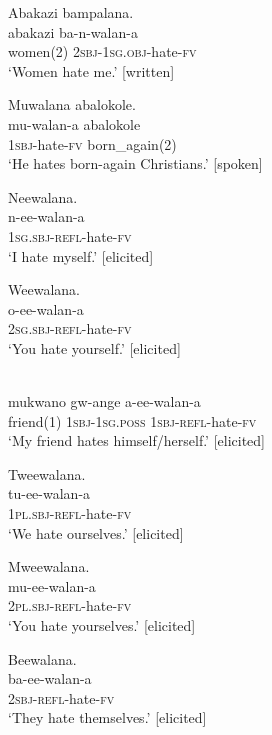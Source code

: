 \documentclass[output=paper,colorlinks,citecolor=brown,
]{langscibook}
\begin{document}
\ea\label{ex:Witzlack:1}

\ea \label{ex:Witzlack:1a}
\glll Abakazi bampalana.\\
        abakazi		ba-n-walan-a\\
     women(2) \textsc{2sbj}-\textsc{1sg.obj}-hate-\textsc{fv}\\
\glt `Women hate me.' [written]

\ex \label{ex:Witzlack:1b}
\glll Muwalana abalokole.\\
    mu-walan-a	abalokole\\
\textsc{1sbj}-hate-\textsc{fv}	born\_again(2)\\
\glt ‘He hates born-again Christians.’ [spoken] %
\z 
\z 

\ea\label{ex:Witzlack:2}

\ea  \label{ex:Witzlack:2a}
\glll Neewalana.\\
    n-ee-walan-a\\
     \textsc{1sg.sbj}-\textsc{refl}-hate-\textsc{fv}\\
\glt ‘I hate myself.’ [elicited]

\ex \label{ex:Witzlack:2b}
\glll Weewalana.\\
    o-ee-walan-a\\
\textsc{2sg.sbj}-\textsc{refl}-hate-\textsc{fv}\\
\glt ‘You hate yourself.’ [elicited]

\ex \label{ex:Witzlack:2c}
\\
 mukwano		gw-ange		a-ee-walan-a\\
friend(1)		\textsc{1sbj-1sg.poss} 	\textsc{1sbj}-\textsc{refl}-hate-\textsc{fv}\\
\glt ‘My friend hates himself/herself.’ [elicited]

\ex  \label{ex:Witzlack:2d}
\glll Tweewalana.\\
    tu-ee-walan-a\\
\textsc{1pl.}\textsc{sbj}-\textsc{refl}-hate-\textsc{fv}\\
\glt ‘We hate ourselves.’ [elicited]

\ex \label{ex:Witzlack:2e}
\glll Mweewalana.\\
    mu-ee-walan-a\\
\textsc{2pl.}\textsc{sbj}-\textsc{refl}-hate-\textsc{fv}\\
\glt ‘You hate yourselves.’ [elicited]

\ex \label{ex:Witzlack:2f}
\glll Beewalana.\\
 ba-ee-walan-a\\
\textsc{2sbj}-\textsc{refl}-hate-\textsc{fv}\\
\glt ‘They hate themselves.’ [elicited]
\z 
\z 
\end{document}
